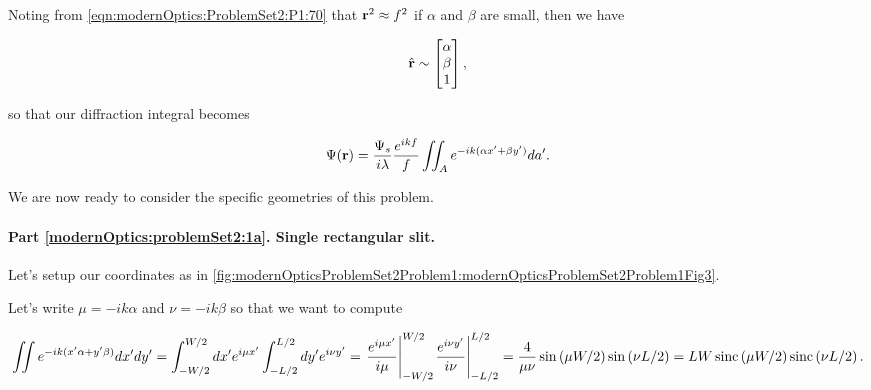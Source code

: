 {Noting from \cref{eqn:modernOptics:ProblemSet2:P1:70} that $\mathbf{r}^2 \approx f^2$ if $\alpha$ and $\beta$ are small, then we have

\begin{equation}\label{eqn:modernOptics:ProblemSet2:P1:170}
\hat{\mathbf{r}} \sim
\begin{bmatrix}
\alpha \\
\beta \\
1
\end{bmatrix},
\end{equation}

so that our diffraction integral becomes

\begin{equation}\label{eqn:modernOptics:ProblemSet2:P1:190}
\Psi(\mathbf{r}) = \frac{\Psi_s}{i \lambda} \frac{e^{i k f}}{f} \iint_A e^{-i k ( \alpha x' + \beta y' ) } da'.
\end{equation}

We are now ready to consider the specific geometries of this problem.

\paragraph{Part \ref{modernOptics:problemSet2:1a}.  Single rectangular slit.}

Let's setup our coordinates as in \cref{fig:modernOpticsProblemSet2Problem1:modernOpticsProblemSet2Problem1Fig3}.


Let's write $\mu = -i k \alpha$ and $\nu = -i k \beta$ so that we want to compute

\begin{dmath}\label{eqn:modernOptics:ProblemSet2:P1:210}
\iint e^{-i k ( x' \alpha + y' \beta ) } dx' dy'
=
\int_{-W/2}^{W/2} dx' e^{i \mu x'}
\int_{-L/2}^{L/2} dy' e^{i \nu y'}
=
\evalrange{ \frac{e^{i \mu x'}}{i \mu} }{-W/2}{W/2}
\evalrange{ \frac{e^{i \nu y'}}{i \nu} }{-L/2}{L/2}
=
\frac{4}{\mu\nu}
\sin\left( \mu W/2 \right)
\sin\left( \nu L/2 \right)
=
L W
\sinc\left( \mu W/2 \right)
\sinc\left( \nu L/2 \right).
\end{dmath}

}
